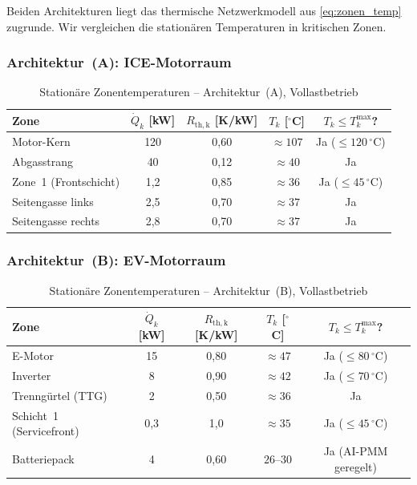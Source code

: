 ﻿\documentclass[12pt,a4paper]{article}
\begin{document}
Beiden Architekturen liegt das thermische Netzwerkmodell aus
\eqref{eq:zonen_temp} zugrunde. Wir vergleichen die stationären Temperaturen
in kritischen Zonen.

\subsubsection{Architektur~(A): ICE-Motorraum}

\begin{table}[H]
	\centering
	\caption{Stationäre Zonentemperaturen -- Architektur~(A), Vollastbetrieb}
	\label{tab:temp_a}
	\begin{tabular}{lcccc}
		\toprule
		\textbf{Zone} & $\dot{Q}_k$ [kW] & $R_\mathrm{th,k}$ [K/kW] &
		$T_k$ [$^\circ$C] & $T_k \leq T_k^\mathrm{max}$? \\
		\midrule
		Motor-Kern           & 120 & 0{,}60 & $\approx 107$ & Ja ($\leq 120\,^\circ$C) \\
		Abgasstrang          & 40  & 0{,}12 & $\approx 40$  & Ja \\
		Zone~1 (Frontschicht)& 1{,}2 & 0{,}85 & $\approx 36$ & Ja ($\leq 45\,^\circ$C) \\
		Seitengasse links    & 2{,}5 & 0{,}70 & $\approx 37$ & Ja \\
		Seitengasse rechts   & 2{,}8 & 0{,}70 & $\approx 37$ & Ja \\
		\bottomrule
	\end{tabular}
\end{table}

\subsubsection{Architektur~(B): EV-Motorraum}

\begin{table}[H]
	\centering
	\caption{Stationäre Zonentemperaturen -- Architektur~(B), Vollastbetrieb}
	\label{tab:temp_b}
	\begin{tabular}{lcccc}
		\toprule
		\textbf{Zone} & $\dot{Q}_k$ [kW] & $R_\mathrm{th,k}$ [K/kW] &
		$T_k$ [$^\circ$C] & $T_k \leq T_k^\mathrm{max}$? \\
		\midrule
		E-Motor              & 15  & 0{,}80 & $\approx 47$  & Ja ($\leq 80\,^\circ$C) \\
		Inverter             & 8   & 0{,}90 & $\approx 42$  & Ja ($\leq 70\,^\circ$C) \\
		Trenngürtel (TTG)    & 2   & 0{,}50 & $\approx 36$  & Ja \\
		Schicht~1 (Servicefront) & 0{,}3 & 1{,}0 & $\approx 35$ & Ja ($\leq 45\,^\circ$C) \\
		Batteriepack         & 4   & 0{,}60 & $26\text{--}30$ & Ja (AI-PMM geregelt) \\
		\bottomrule
	\end{tabular}
\end{table}
\end{document}
